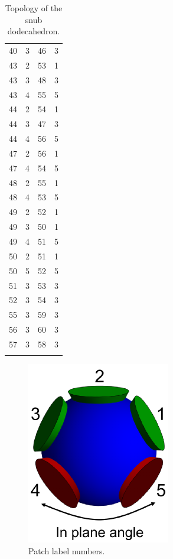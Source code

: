\documentclass[a4paper, amsfonts, amssymb, amsmath, reprint, showkeys, nofootinbib, twoside]{revtex4-1}
\begin{document}
\begin{longtable}[h!]{ cccc }
	40 & 3 & 46 & 3 \\
	43 & 2 & 53 & 1 \\
	43 & 3 & 48 & 3 \\
	43 & 4 & 55 & 5 \\
	44 & 2 & 54 & 1 \\
	44 & 3 & 47 & 3 \\
	44 & 4 & 56 & 5 \\
	47 & 2 & 56 & 1 \\
	47 & 4 & 54 & 5 \\
	48 & 2 & 55 & 1 \\
	48 & 4 & 53 & 5 \\
	49 & 2 & 52 & 1 \\
	49 & 3 & 50 & 1 \\
	49 & 4 & 51 & 5 \\
	50 & 2 & 51 & 1 \\
	50 & 5 & 52 & 5 \\
	51 & 3 & 53 & 3 \\
	52 & 3 & 54 & 3 \\
	55 & 3 & 59 & 3 \\
	56 & 3 & 60 & 3 \\
	57 & 3 & 58 & 3 \\
	\hline
	\caption{Topology of the snub dodecahedron.}
\end{longtable}


\begin{figure}[h]
	\includegraphics{figS1.pdf}
	\caption{\label{S1} Patch label numbers.}
\end{figure}
\end{document}
